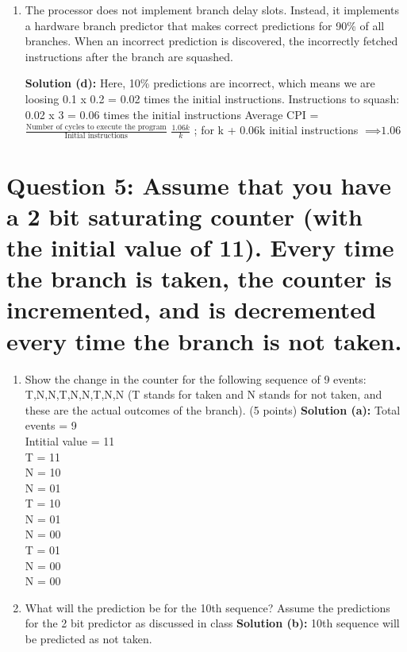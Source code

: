 \documentclass[11pt]{article}
\newenvironment{qparts}{\begin{enumerate}[{(}a{)}]}{\end{enumerate}}
\begin{document}
\begin{qparts}
	\item 
	The processor does not implement branch delay slots. Instead, it implements a hardware branch predictor that makes correct predictions for 90\% of all branches. When an incorrect prediction is discovered, the incorrectly fetched instructions after the branch are squashed.
	
	\newline 
	\textbf{Solution (d): } 
	Here, 10\% predictions are incorrect, which means we are loosing 0.1 x 0.2 = 0.02 times the initial instructions.
	\newline 
	Instructions to squash: 0.02 x 3 = 0.06 times the initial instructions
	\newline 
	Average CPI = $\frac{\text{Number of cycles to execute the program}}{\text{Initial instructions}}$ 
	\newline 
	$\frac{1.06k}{k}$ ; for k + 0.06k  initial instructions
	$\implies \text{1.06}$
	
\end{qparts}

\section*{Question 5: Assume that you have a 2 bit saturating counter (with the initial value of 11). Every time the branch is taken, the counter is incremented, and is decremented every time the branch is not taken. }
\newline 
\begin{qparts}
	\item Show the change in the counter for the following sequence of 9 events: T,N,N,T,N,N,T,N,N  (T stands for taken and N stands for not taken, and these are the actual outcomes of the branch). (5 points)
	\newline 
	\textbf{Solution (a): }
	Total events = 9 \\
	Intitial value = 11 \\
	T = 11 \\
	N = 10 \\
	N = 01 \\
	T = 10 \\
	N = 01 \\
	N = 00 \\
	T = 01 \\ 
	N = 00 \\
	N = 00 \\
	
	\item What will the prediction be for the 10th sequence? Assume the predictions for the 2 bit predictor as discussed in class 
	\newline 
	\textbf{Solution (b): } 10th sequence will be predicted as not taken.
\end{qparts}
\end{document}
